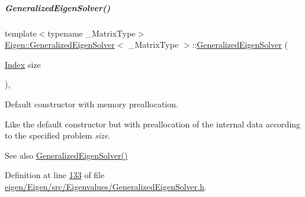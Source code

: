 \mbox{\label{group___eigenvalues___module_aab6423ded30275cd4cdd31758c278694}} 
\subparagraph{\texorpdfstring{Generalized\+Eigen\+Solver()}{GeneralizedEigenSolver()}\hspace{0.1cm}{\footnotesize\ttfamily [2/6]}}
{\footnotesize\ttfamily template$<$typename \+\_\+\+Matrix\+Type$>$ \\
\hyperlink{group___eigenvalues___module_class_eigen_1_1_generalized_eigen_solver}{Eigen\+::\+Generalized\+Eigen\+Solver}$<$ \+\_\+\+Matrix\+Type $>$\+::\hyperlink{group___eigenvalues___module_class_eigen_1_1_generalized_eigen_solver}{Generalized\+Eigen\+Solver} (\begin{DoxyParamCaption}\item[{\hyperlink{group___eigenvalues___module_a46a0ff3841059479ec314e56a5645302}{Index}}]{size }\end{DoxyParamCaption})\hspace{0.3cm}{\ttfamily [inline]}, {\ttfamily [explicit]}}



Default constructor with memory preallocation. 

Like the default constructor but with preallocation of the internal data according to the specified problem {\itshape size}. \begin{DoxySeeAlso}{See also}
\hyperlink{group___eigenvalues___module_ae745f39da43f9df192cc2875d82b4cf1}{Generalized\+Eigen\+Solver()} 
\end{DoxySeeAlso}


Definition at line \hyperlink{eigen_2_eigen_2src_2_eigenvalues_2_generalized_eigen_solver_8h_source_l00133}{133} of file \hyperlink{eigen_2_eigen_2src_2_eigenvalues_2_generalized_eigen_solver_8h_source}{eigen/\+Eigen/src/\+Eigenvalues/\+Generalized\+Eigen\+Solver.\+h}.

